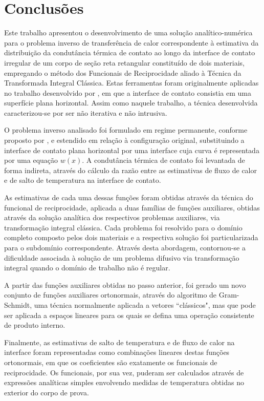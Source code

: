 \section{Conclusões}

Este trabalho apresentou o desenvolvimento de uma solução analítico-numérica para o problema inverso de transferência de calor correspondente à estimativa da distribuição da condutância térmica de contato ao longo da interface de contato irregular de um corpo de seção reta retangular constituído de dois materiais, empregando o método dos Funcionais de Reciprocidade aliado à Técnica da Transformada Integral Clássica. Estas ferramentas foram originalmente aplicadas no trabalho desenvolvido por \cite{tese_padilha}, em que a interface de contato consistia em uma superfície plana horizontal. Assim como naquele trabalho, a técnica desenvolvida caracterizou-se por ser não iterativa e não intrusiva.

O problema inverso analisado foi formulado em regime permanente, conforme proposto por \cite{reciproc_2}, e estendido em relação à configuração original, substituindo a interface de contato plana horizontal por uma interface cuja curva é representada por uma equação $w(x)$. A condutância térmica de contato foi levantada de forma indireta, através do cálculo da razão entre as estimativas de fluxo de calor e de salto de temperatura na interface de contato.

As estimativas de cada uma dessas funções foram obtidas através da técnica do funcional de reciprocidade, aplicada a duas famílias de funções auxiliares, obtidas através da solução analítica dos respectivos problemas auxiliares, via transformação integral clássica. Cada problema foi resolvido para o domínio completo composto pelos dois materiais e a respectiva solução foi particularizada para o subdomínio correspondente. Através desta abordagem, contornou-se a dificuldade associada à solução de um problema difusivo via transformação integral quando o domínio de trabalho não é regular.

A partir das funções auxiliares obtidas no passo anterior, foi gerado um novo conjunto de funções auxiliares ortonormais, através do algoritmo de Gram-Schmidt, uma técnica normalmente aplicada a vetores ``clássicos", mas que pode ser aplicada a espaços lineares para os quais se defina uma operação consistente de produto interno. 

Finalmente, as estimativas de salto de temperatura e de fluxo de calor na interface foram representadas como combinações lineares destas funções ortonormais, em que os coeficientes são exatamente os funcionais de reciprocidade. Os funcionais, por sua vez, puderam ser calculados através de expressões analíticas simples envolvendo medidas de temperatura obtidas no exterior do corpo de prova.

